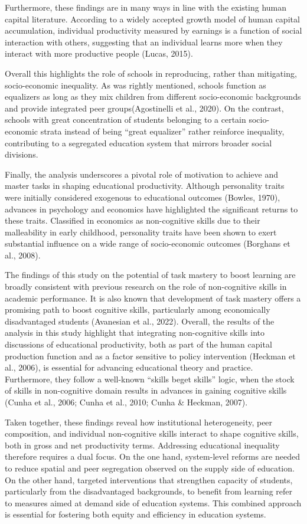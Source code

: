 \documentclass[
]{article}
\begin{document}
Furthermore, these findings are in many ways in line with the existing
human capital literature. According to a widely accepted growth model of
human capital accumulation, individual productivity measured by earnings
is a function of social interaction with others, suggesting that an
individual learns more when they interact with more productive people
(Lucas, 2015).

Overall this highlights the role of schools in reproducing, rather than
mitigating, socio-economic inequality. As was rightly mentioned, schools
function as equalizers as long as they mix children from different
socio-economic backgrounds and provide integrated peer
groups(Agostinelli et al., 2020). On the contrast, schools with great
concentration of students belonging to a certain socio-economic strata
instead of being ``great equalizer'' rather reinforce inequality,
contributing to a segregated education system that mirrors broader
social divisions.

Finally, the analysis underscores a pivotal role of motivation to
achieve and master tasks in shaping educational productivity. Although
personality traits were initially considered exogenous to educational
outcomes (Bowles, 1970), advances in psychology and economics have
highlighted the significant returns to these traits. Classified in
economics as non-cognitive skills due to their malleability in early
childhood, personality traits have been shown to exert substantial
influence on a wide range of socio-economic outcomes (Borghans et al.,
2008).

The findings of this study on the potential of task mastery to boost
learning are broadly consistent with previous research on the role of
non-cognitive skills in academic performance. It is also known that
development of task mastery offers a promising path to boost cognitive
skills, particularly among economically disadvantaged students
(Avanesian et al., 2022). Overall, the results of the analysis in this
study highlight that integrating non-cognitive skills into discussions
of educational productivity, both as part of the human capital
production function and as a factor sensitive to policy intervention
(Heckman et al., 2006), is essential for advancing educational theory
and practice. Furthermore, they follow a well-known ``skills beget
skills'' logic, when the stock of skills in non-cognitive domain results
in advances in gaining cognitive skills (Cunha et al., 2006; Cunha et
al., 2010; Cunha \& Heckman, 2007).

Taken together, these findings reveal how institutional heterogeneity,
peer composition, and individual non-cognitive skills interact to shape
cognitive skills, both in gross and net productivity terms. Addressing
educational inequality therefore requires a dual focus. On the one hand,
system-level reforms are needed to reduce spatial and peer segregation
observed on the supply side of education. On the other hand, targeted
interventions that strengthen capacity of students, particularly from
the disadvantaged backgrounds, to benefit from learning refer to
measures aimed at demand side of education systems. This combined
approach is essential for fostering both equity and efficiency in
education systems.
\end{document}
